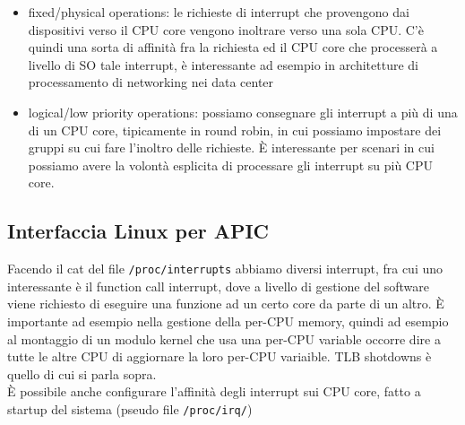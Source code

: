 \documentclass[12pt, oneside]{extbook}
\begin{document}
\begin{itemize}
\item fixed/physical operations: le richieste di interrupt che provengono dai dispositivi verso il CPU core vengono inoltrare verso una sola CPU. C'è quindi una sorta di affinità fra la richiesta ed il CPU core che processerà a livello di SO tale interrupt, è interessante ad esempio in architetture di processamento di networking nei data center
\item logical/low priority operations: possiamo consegnare gli interrupt a più di una di un CPU core, tipicamente in round robin, in cui possiamo impostare dei gruppi su cui fare l'inoltro delle richieste. È interessante per scenari in cui possiamo avere la volontà esplicita di processare gli interrupt su più CPU core.
\end{itemize}
\subsection{Interfaccia Linux per APIC}
Facendo il cat del file \texttt{/proc/interrupts} abbiamo diversi interrupt, fra cui uno interessante è il function call interrupt, dove a livello di gestione del software viene richiesto di eseguire una funzione ad un certo core da parte di un altro. È importante ad esempio nella gestione della per-CPU memory, quindi ad esempio al montaggio di un modulo kernel che usa una per-CPU variable occorre dire a tutte le altre CPU di aggiornare la loro per-CPU variaible. TLB shotdowns è quello di cui si parla sopra.\\ È possibile anche configurare l'affinità degli interrupt sui CPU core, fatto a startup del sistema (pseudo file \texttt{/proc/irq/})
\end{document}
